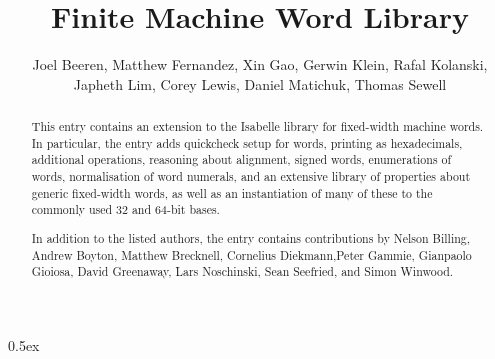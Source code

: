 \documentclass[11pt,a4paper]{article}
\begin{document}
\title{Finite Machine Word Library}
\author{Joel Beeren, Matthew Fernandez, Xin Gao, Gerwin Klein, Rafal Kolanski,\\
       Japheth Lim, Corey Lewis, Daniel Matichuk, Thomas Sewell}
\maketitle

\begin{abstract}
  This entry contains an extension to the Isabelle library for fixed-width
  machine words. In particular, the entry adds quickcheck setup for words,
  printing as hexadecimals, additional operations, reasoning about alignment,
  signed words, enumerations of words, normalisation of word numerals, and an
  extensive library of properties about generic fixed-width words, as well as
  an instantiation of many of these to the commonly used 32 and 64-bit bases.

  In addition to the listed authors, the entry contains contributions by
  Nelson Billing, Andrew Boyton, Matthew Brecknell, Cornelius Diekmann,Peter
  Gammie, Gianpaolo Gioiosa, David Greenaway, Lars Noschinski, Sean Seefried,
  and Simon Winwood.
\end{abstract}

\tableofcontents

\parindent 0pt\parskip 0.5ex


\end{document}
